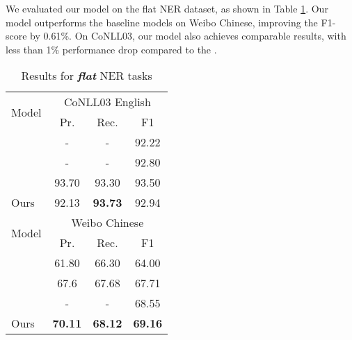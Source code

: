 \documentclass[11pt,a4paper]{article}
\begin{document}
We evaluated our model on the flat NER dataset, as shown in Table \ref{tab:flat}. Our model outperforms the baseline models on Weibo Chinese, improving the F1-score by 0.61\%. On CoNLL03, our model also achieves comparable results, with less than 1\% performance drop compared to the \citep{yu-etal-2020-named}.


\begin{table}[t]
\small
\centering
\begin{tabular}{lccc}
\toprule
\multirow{2}{*}{Model}   & \multicolumn{3}{c}{CoNLL03 English}  \\
 \cmidrule(lr){2-4} 
& Pr.  & Rec. & F1  \\
\midrule

\citet{peters-etal-2018-deep} & -  & -  & 92.22 \\
\citet{devlin-etal-2019-bert} & -  & -  & 92.80 \\
\citet{yu-etal-2020-named} & 93.70  & 93.30  & 93.50     \\
\midrule
Ours    & 92.13  & \textbf{93.73}  & 92.94  \\
\bottomrule
\toprule
\multirow{2}{*}{Model}   & \multicolumn{3}{c}{Weibo Chinese}  \\
 \cmidrule(lr){2-4} 
& Pr.  & Rec. & F1  \\
\midrule





\citet{hu2020slk} & 61.80 &  66.30 &  64.00 \\
\citet{NEURIPS2019_452bf208} & 67.6 &  67.68 & 67.71 \\
\citet{li-etal-2020-flat} & -  & -  & 68.55 \\
\midrule
Ours    & \textbf{70.11}  & \textbf{68.12}  & \textbf{69.16}  \\
\bottomrule
\end{tabular}
\caption{Results for \textit{\textbf{flat}} NER tasks}
\label{tab:flat}
\end{table}
\end{document}
